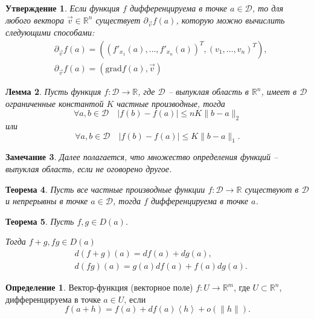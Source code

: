 \documentclass[oneside, final]{book}
\newcommand{\mbb}[1]{\mathbb{#1}}
\newcommand{\mcl}[1]{\mathcal{#1}}
\theoremstyle{plain}
\newtheorem{theorem}{Теорема}[chapter]
\newtheorem{lemma}[theorem]{Лемма}
\newtheorem{statement}[theorem]{Утверждение}
\newtheorem{remark}[theorem]{Замечание}
\theoremstyle{definition}
\newtheorem{mdef}{Определение}[chapter]
\begin{document}
	\begin{statement}
		Если функция $f$ дифференцируема в точке $a\in \mcl D$, то для любого вектора $\vec v \in \mbb R^n$ существует $\partial_{\vec v}f(a)$,
		которую можно вычислить следующими способами:
		\begin{align*}
			&\partial_{\vec v} f(a) = \left((f'_{x_1}(a), \ldots, f'_{x_n}(a))^T, (v_1, \ldots, v_n)^T\right),\\
			&\partial_{\vec v}f(a) = \left(\text{grad}f(a), \vec v\right)
		\end{align*}
	\end{statement}

	\begin{lemma}
		Пусть функция $f\colon \mcl D \to \mbb R$, где $\mcl D$ -- выпуклая область в $\mbb R^n$, имеет в $\mcl D$ ограниченные константой $K$ частные производные, тогда 
		$$
			\forall a, b\in \mcl D \quad |f(b)-f(a)|\le n K \|b-a\|_2
		$$
		или 
		$$
			\forall a,b \in \mcl D \quad |f(b)-f(a)|\le K \|b-a\|_1.
		$$
	\end{lemma}

	\begin{remark}
		Далее полагается, что множество определения функций -- выпуклая область, если не оговорено другое.
	\end{remark}

	\begin{theorem}
		Пусть все частные производные функции $f\colon \mcl D \to \mbb R$ существуют в $\mcl D$ и непрерывны в точке $a\in\mcl D$, тогда $f$ дифференцируема в точке $a$.
	\end{theorem}

	\begin{theorem}
		Пусть $f, g \in D(a)$. 
		
		Тогда $f+g, fg \in D(a)$ 
		\begin{align*}
			&d(f+g)(a) = df(a)+dg(a),\\
			&d(fg)(a)=g(a)df(a)+f(a)dg(a).
		\end{align*}
	\end{theorem}
	
	\begin{mdef}
		Вектор-функция (векторное поле) $f\colon U \to \mbb R^m$, где $U \subset \mbb R^n$, дифференцируема в точке $a\in U$, если 	
		$$
			f(a+h)=f(a)+df(a)\left< h\right> +o(\|h\|).
		$$
	\end{mdef}
\end{document}
